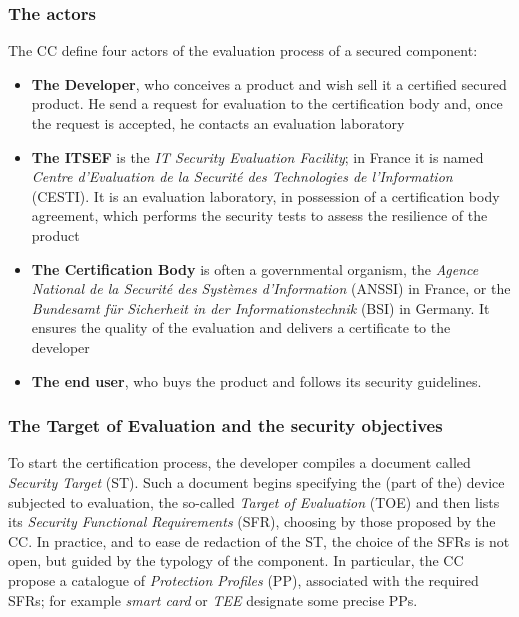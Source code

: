 \subsubsection{The actors} The CC define four actors of the evaluation process of a secured component:
\begin{itemize}
\item \textbf{The Developer}, who conceives a product and wish sell it a certified secured product. He send a request for evaluation to the certification body and, once the request is accepted, he contacts an evaluation laboratory
\item \textbf{The ITSEF} is the \emph{IT Security Evaluation Facility}; in France it is named \emph{Centre d'Evaluation de la Securit\'e des Technologies de l'Information} (CESTI). It is an evaluation laboratory, in possession of a certification body agreement, which performs the security tests to assess the resilience of the product
\item \textbf{The Certification Body} is often a governmental organism, the \emph{Agence National de la Securit\'e des Syst\`emes d'Information} (ANSSI) in France, or the \emph{Bundesamt f\"ur Sicherheit in der Informationstechnik} (BSI) in Germany. It ensures the quality of the evaluation and delivers a certificate to the developer
\item \textbf{The end user}, who buys the product and follows its security guidelines.
\end{itemize} 

\subsubsection{The Target of Evaluation and the security objectives} 
To start the certification process, the developer compiles a document called \emph{Security Target} (ST). Such a document begins specifying the (part of the) device subjected to evaluation, the so-called \emph{Target of Evaluation} (TOE) and then lists its \emph{Security Functional Requirements} (SFR), choosing by those proposed by the CC. In practice, and to ease de redaction of the ST, the choice of the SFRs is not open, but guided by the typology of the component. In particular, the CC propose a catalogue of \emph{Protection Profiles} (PP), associated with the required SFRs; for example \emph{smart card} or \emph{TEE} designate some precise PPs. 

